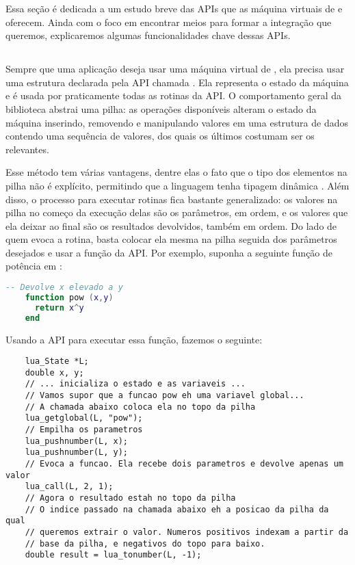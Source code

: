     Essa seção é dedicada a um estudo breve das APIs que as máquina virtuais de
     e  oferecem. Ainda com o foco em encontrar meios
    para formar a integração que queremos, explicaremos algumas funcionalidades
    chave dessas APIs.

    \subsection{}

      Sempre que uma aplicação deseja usar uma máquina virtual de ,
      ela precisa usar uma estrutura declarada pela API chamada
      . Ela representa o estado da máquina e é usada por
      praticamente todas as rotinas da API. O comportamento geral da biblioteca
      abstrai uma pilha: as operações disponíveis alteram o estado da máquina
      inserindo, removendo e manipulando valores em uma estrutura de dados
      contendo uma sequência de valores, dos quais os últimos costumam ser os
      relevantes\footnotemark{}.


      Esse método tem várias vantagens, dentre elas o fato que o tipo dos
      elementos na pilha não é explícito, permitindo que a linguagem tenha
      tipagem dinâmica \cite{pl:00}. Além disso, o processo para executar
      rotinas fica bastante generalizado: os valores na pilha no começo da
      execução delas são os parâmetros, em ordem, e os valores que ela deixar ao
      final são os resultados devolvidos, também em ordem. Do lado de quem evoca
      a rotina, basta colocar ela mesma na pilha seguida dos parâmetros
      desejados e usar a função  da API. Por exemplo, suponha
      a seguinte função de potência em :

    \begin{lstlisting}[language=lua]
    -- Devolve x elevado a y
    function pow (x,y)
      return x^y
    end
    \end{lstlisting}

      Usando a API para executar essa função, fazemos o seguinte:

    \begin{lstlisting}
    lua_State *L;
    double x, y;
    // ... inicializa o estado e as variaveis ...
    // Vamos supor que a funcao pow eh uma variavel global...
    // A chamada abaixo coloca ela no topo da pilha
    lua_getglobal(L, "pow");
    // Empilha os parametros
    lua_pushnumber(L, x);
    lua_pushnumber(L, y);
    // Evoca a funcao. Ela recebe dois parametros e devolve apenas um valor
    lua_call(L, 2, 1);
    // Agora o resultado estah no topo da pilha
    // O indice passado na chamada abaixo eh a posicao da pilha da qual
    // queremos extrair o valor. Numeros positivos indexam a partir da
    // base da pilha, e negativos do topo para baixo.
    double result = lua_tonumber(L, -1);
    \end{lstlisting}

